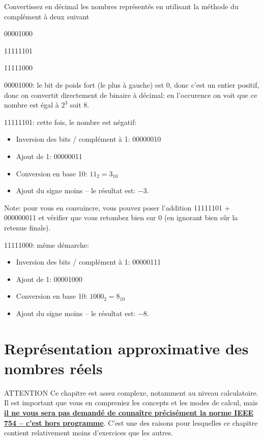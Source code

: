 \documentclass[12pt]{article}
\begin{document}
	\begin{MonExo}
		Convertissez en décimal les nombres représentés en utilisant la méthode du complément à deux suivant
		\begin{alphenum}
			\item 00001000
			\item 11111101
			\item 11111000
		\end{alphenum}
	\end{MonExo}
	\begin{MaReponse}
		\begin{alphenum}
			\item 00001000: le bit de poids fort (le plus à gauche) est 0, donc c'est un entier positif, donc on convertit directement de binaire à décimal: en l'occurence on voit que ce nombre est égal à $2^3$ soit 8.
			\item 11111101: cette fois, le nombre est négatif:
			\begin{itemize}
				\item Inversion des bits / complément à 1: 00000010
				\item Ajout de 1: 00000011
				\item Conversion en base 10: $11_2 = 3_{10}$
				\item Ajout du signe moins -- le résultat est: $-3$.
			\end{itemize}
			Note: pour vous en convaincre, vous pouvez poser l'addition 11111101 + 000000011 et vérifier que vous retombez bien sur 0 (en ignorant bien sûr la retenue finale).
			\item 11111000: même démarche:
			\begin{itemize}
				\item Inversion des bits / complément à 1: 00000111
				\item Ajout de 1: 00001000
				\item Conversion en base 10: $1000_2 = 8_{10}$
				\item Ajout du signe moins -- le résultat est: $-8$.
			\end{itemize}
		\end{alphenum}
	\end{MaReponse}
	
	\pagebreak
	
	\section{Représentation approximative des nombres réels}
	\begin{MonAmp}{ATTENTION}
		Ce chapitre est assez complexe, notamment au niveau calculatoire. Il est important que vous en compreniez les concepts et les modes de calcul, mais \textbf{\uline{il ne vous sera pas demandé de connaître précisément la norme IEEE 754 -- c'est hors programme}}. C'est une des raisons pour lesquelles ce chapitre contient relativement moins d'exercices que les autres.
	\end{MonAmp}
	
\end{document}
